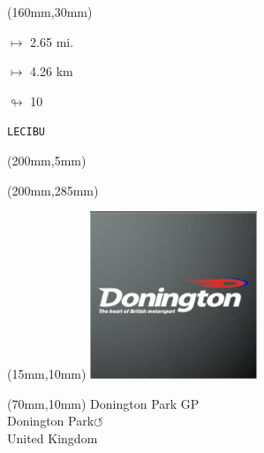 \begin{textblock*}{40mm}(160mm,30mm)%
\Large
\par$\mapsto$ 2.65 mi.
\par$\mapsto$ 4.26 km
\par$\looparrowright$ 10
\par\hfill\tiny\tt LECIBU\\
\end{textblock*}
\begin{textblock*}{20mm}(200mm,5mm)%
\fbox{\thepage}
\label{LECIBU}
\end{textblock*}
\begin{textblock*}{20mm}(200mm,285mm)%
\fbox{\thepage}
\end{textblock*}

\null\newpage
\begin{textblock*}{50mm}(15mm,10mm)%
\includegraphics[width=50mm]{LG/2015-05-20_00080.png}
\end{textblock*}
\begin{textblock*}{130mm}(70mm,10mm)%
{\fontsize{20}{20}\selectfont Donington Park GP\\}
{\fontsize{16}{16}\selectfont Donington Park\hfill \huge$\circlearrowleft$\\}
{\fontsize{12}{12}\selectfont United Kingdom\\}
\end{textblock*}

